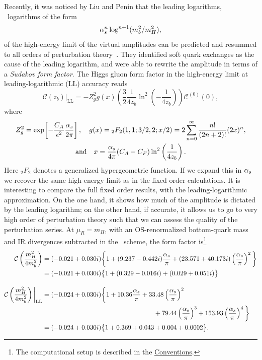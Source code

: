 Recently, it was noticed by Liu and Penin that the leading logarithms, \ie\ logarithms of the form
\begin{equation}
\alpha_s^n \log^{n + 1} (m_b^2/m_H^2),
\end{equation}
of the high-energy limit of the virtual amplitudes can be predicted and resummed to all orders of perturbation theory~\cite{Liu:2017vkm}. They identified soft quark exchanges as the cause of the leading logarithm, and were able to rewrite the amplitude in terms of a \textit{Sudakov form factor}. The Higgs gluon form factor in the high-energy limit at leading-logarithmic (\acs{LL}) accuracy reads
\begin{equation}
\mathcal{C}(z_b) \bigg \vert_{\text{LL}} = - Z_g^2 g(x) \left(\frac{3}{2} \frac{1}{4z_b} \ln^2 \left(-\frac{1}{4z_b} \right) \right) \mathcal{C}^{(0)}(0),
\end{equation}
where
\begin{equation}
\begin{gathered}
Z_g^2 = \exp\! \left[- \frac{C_A}{\epsilon^2} \frac{\alpha_s}{2 \pi} \right], \quad g(x) = {}_2F_2(1, 1;3/2,2;x/2) = 2 \sum_{n = 0}^\infty \frac{n!}{(2 n + 2)!} (2 x)^{n}, \\
\text{and} \quad x = \frac{\alpha_s}{4 \pi} (C_A - C_F) \ln^2\left(\frac{1}{4 z_b} \right).
\end{gathered}
\label{eq:5:sudakov_resummation}
\end{equation}
Here ${}_2F_{2}$ denotes a generalized hypergeometric function. If we expand this in $\alpha_s$ we recover the same high-energy limit as in the fixed order calculations. It is interesting to compare the full fixed order results, with the leading-logarithmic approximation. On the one hand, it shows how much of the amplitude is dictated by the leading logarithm; on the other hand, if accurate, it allows us to go to very high order of perturbation theory such that we can assess the quality of the perturbation series. At $\mu_R = m_H$, with an \acs{OS}-renormalized bottom-quark mass and \acs{IR} divergences subtracted in the \MS\ scheme, the form factor is\footnote{The computational setup is described in the \hyperref[chap:notation_and_conventions]{Conventions}.}
\begin{equation}
\begin{split}
\mathcal{C} \left(\frac{m_H^2}{4 m_b^2}\right) &= (-0.021 + 0.030 i) \bigg \lbrace 1 + (9.237 - 0.442 i) \frac{\alphas}{\pi} + (23.571 + 40.173 i) \left(\frac{\alphas}{\pi} \right)^2 \bigg \rbrace \\
&= (-0.021 + 0.030 i) \big \lbrace 1 + (0.329 - 0.016 i) + (0.029 + 0.051 i) \big \rbrace \\[10pt]
%
\mathcal{C} \left(\frac{m_H^2}{4 m_b^2} \right) \bigg \vert_{\text{LL}} &= (-0.024 + 0.030 i) \bigg \lbrace 1 + 10.36 \frac{\alphas}{\pi} + 33.48 \left(\frac{\alphas}{\pi} \right)^2  \\
&\hspace{6cm} + 79.44 \left(\frac{\alphas}{\pi}\right)^3 + 153.93 \left( \frac{\alphas}{\pi} \right)^4 \bigg \rbrace \\
&= (-0.024 + 0.030 i) \big \lbrace 1 + 0.369 + 0.043 + 0.004 + 0.0002 \big \rbrace .
\end{split}
\label{eq:5:LL_comparison}
\end{equation}
